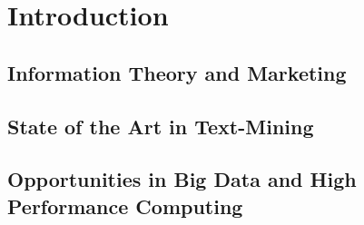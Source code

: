 \chapter{Introduction\label{intro}}

\section{Information Theory and Marketing}
\section{State of the Art in Text-Mining}
\section{Opportunities in Big Data and High Performance Computing}

